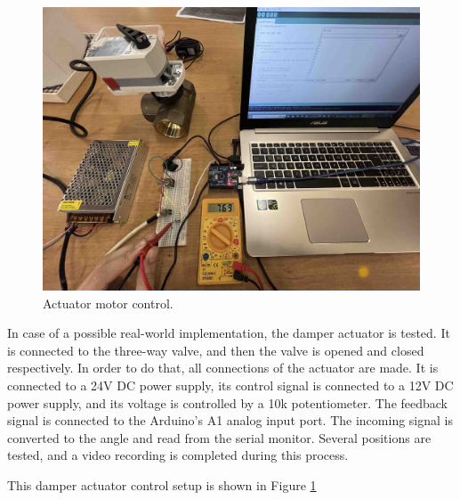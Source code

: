 \begin{figure}[H]
    \centering
    \includegraphics[width=15cm]{images/actuator.jpg}
    \caption{Actuator motor control.}
    \label{fig:actuator}
\end{figure}

\par
In case of a possible real-world implementation, the damper actuator is tested. It is connected to the three-way valve, and then the valve is opened and closed respectively. In order to do that, all connections of the actuator are made. It is connected to a 24V DC power supply, its control signal is connected to a 12V DC power supply, and its voltage is controlled by a 10k potentiometer. The feedback signal is connected to the Arduino's A1 analog input port. The incoming signal is converted to the angle and read from the serial monitor. Several positions are tested, and a video recording is completed during this process.

\par
This damper actuator control setup is shown in Figure \ref{fig:actuator}

